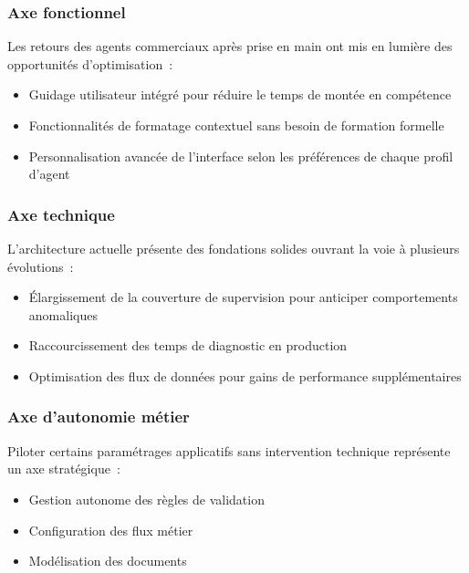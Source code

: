 \subsubsection*{Axe fonctionnel}

Les retours des agents commerciaux apr\`es prise en main ont mis en lumi\`ere des opportunit\'es d'optimisation~:

\begin{itemize}
  \item Guidage utilisateur int\'egr\'e pour r\'eduire le temps de mont\'ee en comp\'etence
  \item Fonctionnalit\'es de formatage contextuel sans besoin de formation formelle
  \item Personnalisation avanc\'ee de l'interface selon les pr\'ef\'erences de chaque profil d'agent
\end{itemize}

\subsubsection*{Axe technique}

L'architecture actuelle pr\'esente des fondations solides ouvrant la voie \`a plusieurs \'evolutions~:

\begin{itemize}
  \item \'Elargissement de la couverture de supervision pour anticiper comportements anomaliques
  \item Raccourcissement des temps de diagnostic en production
  \item Optimisation des flux de donn\'ees pour gains de performance suppl\'ementaires
\end{itemize}

\subsubsection*{Axe d'autonomie m\'etier}

Piloter certains param\'etrages applicatifs sans intervention technique repr\'esente un axe strat\'egique~:

\begin{itemize}
  \item Gestion autonome des r\`egles de validation
  \item Configuration des flux m\'etier
  \item Mod\'elisation des documents
\end{itemize}

